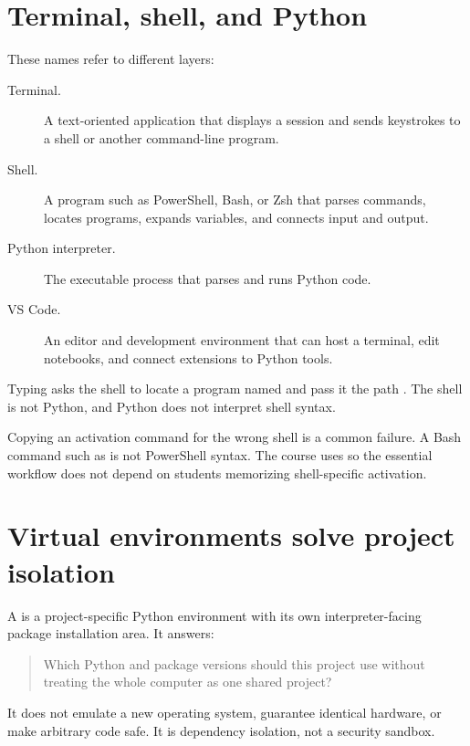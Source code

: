 \section{Terminal, shell, and Python}

These names refer to different layers:

\begin{description}
  \item[Terminal.] A text-oriented application that displays a session and
  sends keystrokes to a shell or another command-line program.
  \item[Shell.] A program such as PowerShell, Bash, or Zsh that parses commands,
  locates programs, expands variables, and connects input and output.
  \item[Python interpreter.] The executable process that parses and runs Python
  code.
  \item[VS Code.] An editor and development environment that can host a terminal,
  edit notebooks, and connect extensions to Python tools.
\end{description}

Typing  asks the shell to locate a program named
 and pass it the path . The shell is not Python,
and Python does not interpret shell syntax.

\begin{warningbox}
Copying an activation command for the wrong shell is a common failure. A Bash
command such as  is not PowerShell syntax. The
course uses  so the essential workflow does not depend on students
memorizing shell-specific activation.
\end{warningbox}

\section{Virtual environments solve project isolation}

A  is a project-specific Python environment with its
own interpreter-facing package installation area. It answers:

\begin{quote}
Which Python and package versions should this project use without treating the
whole computer as one shared project?
\end{quote}

It does not emulate a new operating system, guarantee identical hardware, or
make arbitrary code safe. It is dependency isolation, not a security sandbox.

